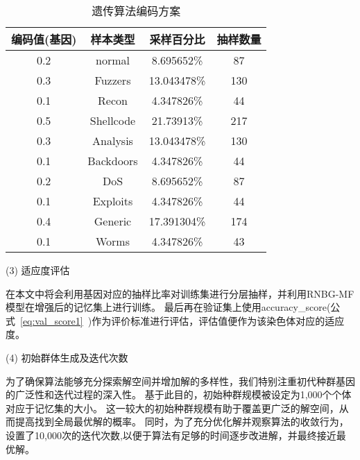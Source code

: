 \begin{table}
	\caption{遗传算法编码方案}
	\label{tab:Ga_code}
	\centering
	\begin{tabular}{cccc}
		\toprule
		\textbf{编码值(基因)} & \textbf{样本类型} & \textbf{采样百分比} & \textbf{抽样数量} \\
		\midrule
		0.2              & normal        & 8.695652\%     & 87            \\
		0.3              & Fuzzers       & 13.043478\%    & 130           \\
		0.1              & Recon         & 4.347826\%     & 44            \\
		0.5              & Shellcode     & 21.73913\%     & 217           \\
		0.3              & Analysis      & 13.043478\%    & 130           \\
		0.1              & Backdoors     & 4.347826\%     & 44            \\
		0.2              & DoS           & 8.695652\%     & 87            \\
		0.1              & Exploits      & 4.347826\%     & 44            \\
		0.4              & Generic       & 17.391304\%    & 174           \\
		0.1              & Worms         & 4.347826\%     & 43            \\
		\bottomrule
	\end{tabular}
\end{table}

(3) 适应度评估\par
在本文中将会利用基因对应的抽样比率对训练集进行分层抽样，并利用RNBG-MF模型在增强后的记忆集上进行训练。
最后再在验证集上使用accuracy\_score(公式~\ref{eq:val_score1}~)作为评价标准进行评估，评估值便作为该染色体对应的适应度。\par

(4) 初始群体生成及迭代次数\par
为了确保算法能够充分探索解空间并增加解的多样性，我们特别注重初代种群基因的广泛性和迭代过程的深入性。
基于此目的，初始种群规模被设定为1,000个个体对应于记忆集的大小。
这一较大的初始种群规模有助于覆盖更广泛的解空间，从而提高找到全局最优解的概率。
同时，为了充分优化解并观察算法的收敛行为，设置了10,000次的迭代次数,以便于算法有足够的时间逐步改进解，并最终接近最优解。\par

